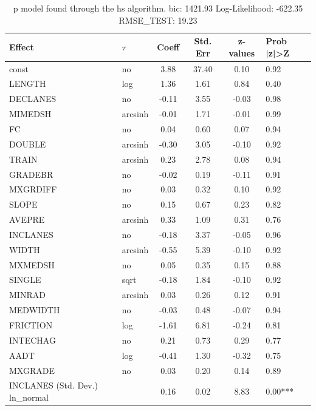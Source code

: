 \begin{table}
	\caption{p model found through the hs algorithm. bic: 1421.93 Log-Likelihood: -622.35 RMSE_TEST: 19.23}
	\begin{center}
		\begin{tabular}{|l|l|c|c|c|l|}
			\hline
			Effect & $\tau$ & Coeff & Std. Err & z-values & Prob |z|>Z \\
			\hline
			const & no & 3.88 & 37.40 & 0.10 & 0.92 \\
			\hline
			LENGTH & log & 1.36 & 1.61 & 0.84 & 0.40 \\
			\hline
			DECLANES & no & -0.11 & 3.55 & -0.03 & 0.98 \\
			\hline
			MIMEDSH & arcsinh & -0.01 & 1.71 & -0.01 & 0.99 \\
			\hline
			FC & no & 0.04 & 0.60 & 0.07 & 0.94 \\
			\hline
			DOUBLE & arcsinh & -0.30 & 3.05 & -0.10 & 0.92 \\
			\hline
			TRAIN & arcsinh & 0.23 & 2.78 & 0.08 & 0.94 \\
			\hline
			GRADEBR & no & -0.02 & 0.19 & -0.11 & 0.91 \\
			\hline
			MXGRDIFF & no & 0.03 & 0.32 & 0.10 & 0.92 \\
			\hline
			SLOPE & no & 0.15 & 0.67 & 0.23 & 0.82 \\
			\hline
			AVEPRE & arcsinh & 0.33 & 1.09 & 0.31 & 0.76 \\
			\hline
			INCLANES & no & -0.18 & 3.37 & -0.05 & 0.96 \\
			\hline
			WIDTH & arcsinh & -0.55 & 5.39 & -0.10 & 0.92 \\
			\hline
			MXMEDSH & no & 0.05 & 0.35 & 0.15 & 0.88 \\
			\hline
			SINGLE & sqrt & -0.18 & 1.84 & -0.10 & 0.92 \\
			\hline
			MINRAD & arcsinh & 0.03 & 0.26 & 0.12 & 0.91 \\
			\hline
			MEDWIDTH & no & -0.03 & 0.48 & -0.07 & 0.94 \\
			\hline
			FRICTION & log & -1.61 & 6.81 & -0.24 & 0.81 \\
			\hline
			INTECHAG & no & 0.21 & 0.73 & 0.29 & 0.77 \\
			\hline
			AADT & log & -0.41 & 1.30 & -0.32 & 0.75 \\
			\hline
			MXGRADE & no & 0.03 & 0.20 & 0.14 & 0.89 \\
			\hline
			INCLANES (Std. Dev.) ln_normal &  & 0.16 & 0.02 & 8.83 & 0.00*** \\

\end{tabular}
\end{center}
\end{table}
